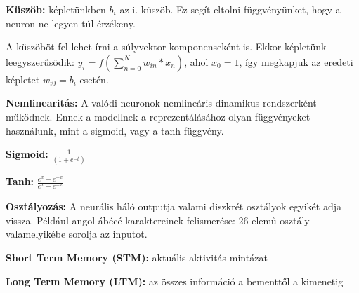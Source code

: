 \documentclass{article}
\begin{document}
\textbf{Küszöb:} képletünkben $b_i$ az i. küszöb. Ez segít eltolni függvényünket, hogy a neuron ne legyen túl érzékeny. \newline

A küszöböt fel lehet írni a súlyvektor komponenseként is. Ekkor képletünk leegyszerűsödik: $y_i = f(\sum_{n=0}^N w_{in}*x_n)$, ahol $x_0 = 1$, így megkapjuk az eredeti képletet $w_{i0} = b_i$ esetén. \newline

\textbf{Nemlinearitás:} A valódi neuronok nemlineáris dinamikus rendszerként működnek. Ennek a modellnek a reprezentálásához olyan függvényeket használunk, mint a sigmoid, vagy a tanh függvény. \newline

\textbf{Sigmoid:} $\frac{1}{(1+e^{-t})}$ \newline

\textbf{Tanh:} $\frac{e^x-e^{-x}}{e^x+e^{-x}}$ \newline

\textbf{Osztályozás:} A neurális háló outputja valami diszkrét osztályok egyikét adja vissza. Például angol ábécé karaktereinek felismerése: 26 elemű osztály valamelyikébe sorolja az inputot. \newline

\textbf{Short Term Memory (STM):} aktuális aktivitás-mintázat \newline

\textbf{Long Term Memory (LTM):} az összes információ a bementtől a kimenetig \newline
\newpage
\end{document}
